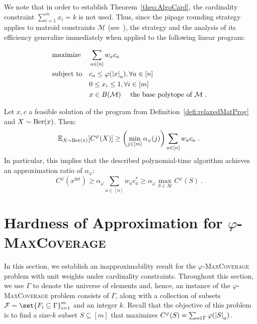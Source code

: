We note that in order to establish Theorem~\ref{theo:AlgoCard}, the cardinality constraint $\sum_{i=1}^m x_i = k$ is not used. Thus, since the pipage rounding strategy applies to matroid constraints $\mathcal{M}$ (see~\cite[Lemma 3.4]{Vondrak07}), the strategy and the analysis of its efficiency generalize immediately when applied to the following linear program:

\begin{definition}
  \begin{equation}
    \begin{aligned}
      &\operatorname{\text{maximize}}&& \sum_{a \in [n]} w_ac_a \\
      &\operatorname{\text{subject to}}&& c_a \leq \varphi(\abs{x}_a), \forall a \in [n]\\
      &&& 0 \leq x_i \leq 1, \forall i \in [m]\\
      &&& x \in B(\mathcal{M}) \quad \text{ the base polytope of } \mathcal{M} \ .
    \end{aligned}
  \end{equation}
  \label{defi:relaxedMatProg}
\end{definition}

\begin{theorem}
  Let $x,c$ a feasible solution of the program from Definition~\ref{defi:relaxedMatProg} and $X \sim \operatorname{\text{Ber}}(x)$. Then:
  \[\mathbb{E}_{X \sim \operatorname{\text{Ber}}(x)}[C^{\varphi}(X)] \geq \left(\min_{j \in [m]} \alpha_{\varphi}(j)\right) \sum_{a \in [n]} w_ac_a \ .\]
  In particular, this implies that the described polynomial-time algorithm achieves an approximation ratio of $\alpha_{\varphi}$:
  \[C^{\varphi}(x^{\text{int}}) \geq \alpha_{\varphi} \sum_{a \in [n]} w_ac^*_a \geq \alpha_{\varphi} \max_{S \in \mathcal{M}} C^{\varphi}(S)\ .\]
  \label{theo:AlgoMat}
\end{theorem}

    
\section{Hardness of Approximation for $\varphi$-\textsc{MaxCoverage}}
\label{section:Hardness}
In this section, we establish an inapproximability result for the $\varphi$-\textsc{MaxCoverage} problem with unit weights under cardinality constraints. Throughout this section, we use $\Gamma$ to denote the universe of elements and, hence, an instance of the $\varphi$-\textsc{MaxCoverage} problem consists of $\Gamma$, along with a collection of subsets $\mathcal{F} = \set{F_i \subseteq \Gamma}_{i=1}^m$  and an integer $k$. Recall that the objective of this problem is to find a size-$k$ subset $S \subseteq [m]$ that maximizes $C^{\varphi}(S) = \sum_{a \in \Gamma}\varphi(\abs{S}_a)$.


